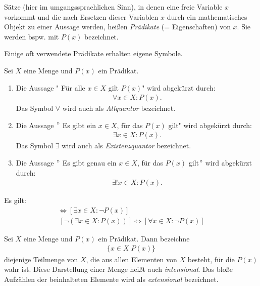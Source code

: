 \begin{mydef}
    Sätze (hier im umgangssprachlichen Sinn), in denen eine freie Variable $x$ vorkommt und die nach Ersetzen dieser Variablen $x$ durch ein mathematisches Objekt zu einer Aussage werden, 
    heißen \textit{Prädikate} (= Eigenschaften) von $x$. Sie werden bspw. mit $P(x)$ bezeichnet.
\end{mydef}

Einige oft verwendete Prädikate erhalten eigene Symbole. 

\begin{mydef}
    Sei $X$ eine Menge und $P(x)$ ein Prädikat.
    \begin{enumerate}
        \item 
        Die Aussage " Für alle $x \in X$ gilt $P(x)$"  wird abgekürzt durch: 
        \begin{align*}
            \forall x \in X : P(x).
        \end{align*}
        Das Symbol $\forall$ wird auch als \textit{Allquantor} bezeichnet. 
        \item 
        Die Aussage $"$ Es gibt ein $x \in X$, für das $P(x)$ gilt"  wird abgekürzt durch: 
        \begin{align*}
            \exists x \in X : P(x).
        \end{align*}
        Das Symbol $\exists$ wird auch als \textit{Existenzquantor} bezeichnet. 
        \item 
        Die Aussage $"$ Es gibt genau ein $x \in X$, für das $P(x)$ gilt$"$ wird abgekürzt durch:
        \begin{align*}
            \exists ! x \in X : P(x). 
        \end{align*}
    \end{enumerate}
\end{mydef}

\begin{remark}
    Es gilt: 
    \begin{align*}
        [ \neg (\forall x \in X: P(x))] \iff [\exists x \in X: \neg P(x)] \\\
        [ \neg (\exists x \in X: P(x))] \iff [\forall x \in X: \neg P(x)]
    \end{align*}
\end{remark}

\begin{mydef}
    Sei $X$ eine Menge und $P(x)$ ein Prädikat. Dann bezeichne 
    \begin{align*}
        \{ x \in X | P(x) \}
    \end{align*}
    diejenige Teilmenge von $X$, die aus allen Elementen von $X$ besteht, für die $P(x)$ wahr ist. Diese Darstellung einer Menge heißt auch \textit{intensional}. 
    Das bloße Aufzählen der beinhalteten Elemente wird als \textit{extensional} bezeichnet. 
\end{mydef}

